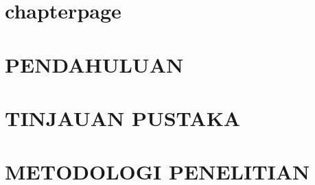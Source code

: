\documentclass[12pt, a4paper, onecolumn, oneside, final]{report}
\theoremstyle{definition}
\numberwithin{equation}{chapter}
\begin{document}
%
\newpage
\makeatother
{}
\assignpagestyle\chapter{chapterpage}
\setcounter{page}{1}
\pagestyle{myPS}
\def\thechapter{\Roman{chapter}} 
\def\thesection{\arabic{chapter}.\arabic{section}}
\def\thesubsection{\arabic{chapter}.\arabic{section}.\arabic{subsection}}
\def\theequation{\arabic{chapter}.\arabic{equation}}
\def\thefigure{\arabic{chapter}.\arabic{figure}}
\def\thetable{\arabic{chapter}.\arabic{table}}
\chapter{PENDAHULUAN}

\chapter{TINJAUAN PUSTAKA}

\chapter{METODOLOGI PENELITIAN}

%
\end{document}
